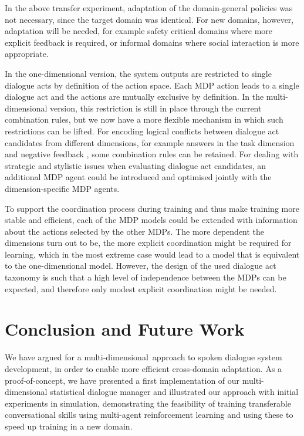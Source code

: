 \documentclass[11pt]{article}
\def\mdim{multi\hyp dimensional}
\begin{document}
In the above transfer experiment, adaptation of the domain-general policies was not necessary, since the target domain was identical.  For new domains, however, adaptation will be needed, for example safety critical domains where more explicit feedback is required, or informal domains where social interaction is more appropriate.

In the one-dimensional version, the system outputs are restricted to single dialogue acts by definition of the action space.  Each MDP action leads to a single dialogue act and the actions are mutually exclusive by definition.  In the multi-dimensional version, this restriction is still in place through the current combination rules, but we now have a more flexible mechanism in which such restrictions can be lifted.  For encoding logical conflicts between dialogue act candidates from different dimensions, for example answers in the task dimension and negative feedback \cite{Keizer:2007ve}, some combination rules can be retained.  For dealing with strategic and stylistic issues when evaluating dialogue act candidates, an additional MDP agent could be introduced and optimised jointly with the dimension-specific MDP agents.

To support the coordination process during training and thus make training more stable and efficient, each of the MDP models could be extended with information about the actions selected by the other MDPs.  The more dependent the dimensions turn out to be, the more explicit coordination might be required for learning, which in the most extreme case would lead to a model that is equivalent to the one-dimensional model.  However, the design of the used dialogue act taxonomy is such that a high level of independence between the MDPs can be expected, and therefore only modest explicit coordination might be needed.


\section{Conclusion and Future Work}\label{sec:concl}

We have argued for a \mdim\ approach to spoken dialogue system development, in order to enable more efficient cross-domain adaptation.  As a proof-of-concept, we have presented a first implementation of our multi-dimensional statistical dialogue manager and illustrated our approach with initial experiments in simulation, demonstrating the feasibility of training transferable conversational skills using multi-agent reinforcement learning and using these to speed up training in a new domain.
\end{document}
